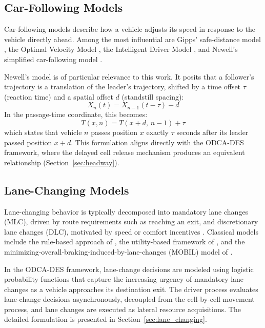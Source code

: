 \documentclass[review,authoryear]{elsarticle}
\begin{document}
\subsection{Car-Following Models}
\label{sec:lit_cf}

Car-following models describe how a vehicle adjusts its speed in response to the vehicle directly ahead. Among the most influential are Gipps' safe-distance model \citep{gipps1981behavioural}, the Optimal Velocity Model \citep{bando1995dynamical}, the Intelligent Driver Model \citep{treiber2000congested}, and Newell's simplified car-following model \citep{newell2002simplified}.

Newell's model is of particular relevance to this work. It posits that a follower's trajectory is a translation of the leader's trajectory, shifted by a time offset $\tau$ (reaction time) and a spatial offset $d$ (standstill spacing):
\begin{equation}
    X_{n}(t) = X_{n-1}(t - \tau) - d
    \label{eq:newell_cf}
\end{equation}
In the passage-time coordinate, this becomes:
\begin{equation}
    T(x, n) = T(x + d,\, n-1) + \tau
    \label{eq:newell_cf_Txn}
\end{equation}
which states that vehicle $n$ passes position $x$ exactly $\tau$ seconds after its leader passed position $x + d$. This formulation aligns directly with the ODCA-DES framework, where the delayed cell release mechanism produces an equivalent relationship (Section~\ref{sec:headway}).

\subsection{Lane-Changing Models}
\label{sec:lit_lc}

Lane-changing behavior is typically decomposed into mandatory lane changes (MLC), driven by route requirements such as reaching an exit, and discretionary lane changes (DLC), motivated by speed or comfort incentives \citep{zheng2014recent}. Classical models include the rule-based approach of \citet{gipps1986model}, the utility-based framework of \citet{toledo2003modeling}, and the minimizing-overall-braking-induced-by-lane-changes (MOBIL) model of \citet{kesting2007general}.

In the ODCA-DES framework, lane-change decisions are modeled using logistic probability functions that capture the increasing urgency of mandatory lane changes as a vehicle approaches its destination exit. The driver process evaluates lane-change decisions asynchronously, decoupled from the cell-by-cell movement process, and lane changes are executed as lateral resource acquisitions. The detailed formulation is presented in Section~\ref{sec:lane_changing}.
\end{document}
